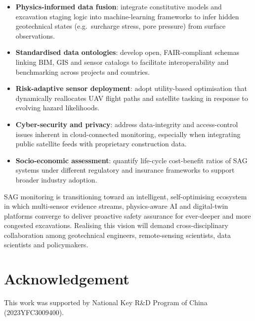 \documentclass[preprint,11pt,authoryear,3p]{elsarticle}
\begin{document}
\begin{itemize}
    \item \textbf{Physics-informed data fusion}: integrate constitutive models and excavation staging logic into machine-learning frameworks to infer hidden geotechnical states (e.g.\ surcharge stress, pore pressure) from surface observations.
    \item \textbf{Standardised data ontologies}: develop open, FAIR-compliant schemas linking BIM, GIS and sensor catalogs to facilitate interoperability and benchmarking across projects and countries.
    \item \textbf{Risk-adaptive sensor deployment}: adopt utility-based optimisation that dynamically reallocates UAV flight paths and satellite tasking in response to evolving hazard likelihoods.
    \item \textbf{Cyber-security and privacy}: address data-integrity and access-control issues inherent in cloud-connected monitoring, especially when integrating public satellite feeds with proprietary construction data.
    \item \textbf{Socio-economic assessment}: quantify life-cycle cost-benefit ratios of SAG systems under different regulatory and insurance frameworks to support broader industry adoption.
\end{itemize}

SAG monitoring is transitioning toward an intelligent, self-optimising ecosystem in which multi-sensor evidence streams, physics-aware AI and digital-twin platforms converge to deliver proactive safety assurance for ever-deeper and more congested excavations. Realising this vision will demand cross-disciplinary collaboration among geotechnical engineers, remote-sensing scientists, data scientists and policymakers.

\section*{Acknowledgement}

This work was supported by National Key R\&D Program of China (2023YFC3009400).





\end{document}
